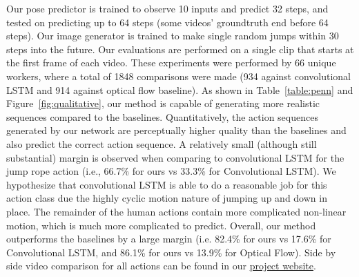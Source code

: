 \documentclass{article}
\begin{document}
Our pose predictor is trained to observe 10 inputs and predict 32 steps, and tested on predicting up to 64 steps (some videos' groundtruth end before 64 steps).
Our image generator is trained to make single random jumps within 30 steps into the future.
Our evaluations are performed on a single clip that starts at the first frame of each video.
These experiments were performed by 66 unique workers, where a total of 1848 comparisons were made (934 against convolutional LSTM and 914 against optical flow baseline).
As shown in Table~\ref{table:penn} and Figure~\ref{fig:qualitative}, our method is capable of generating more realistic sequences compared to the baselines.
Quantitatively, the action sequences generated by our network are perceptually higher quality than the baselines and also predict the correct action sequence. 
A relatively small (although still substantial) margin is observed when comparing to convolutional LSTM for the jump rope action (i.e., 66.7\% for ours vs 33.3\% for Convolutional LSTM).
We hypothesize that convolutional LSTM is able to do a reasonable job for this action class due the highly cyclic motion nature of jumping up and down in place.
The remainder of the human actions contain more complicated non-linear motion, which is much more complicated to predict.
Overall, our method outperforms the baselines by a large margin (i.e. 82.4\% for ours vs 17.6\% for Convolutional LSTM, and 86.1\% for ours vs 13.9\% for Optical Flow).
Side by side video comparison for all actions can be found in our \href{https://goo.gl/U7UOfy}{project website}.
\end{document}
